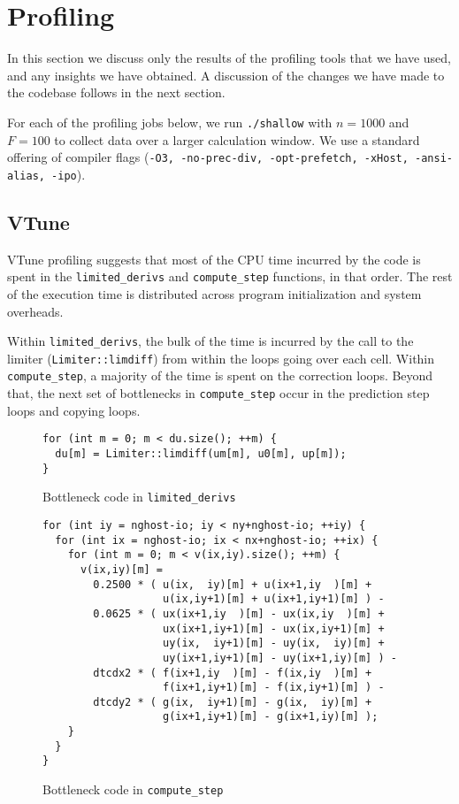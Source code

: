 \documentclass{scrartcl}
\begin{document}
  \section{Profiling}
    In this section we discuss only the results of the profiling tools that we have used, and any insights we have obtained. A discussion of the changes we have made to the codebase follows in the next section.

    For each of the profiling jobs below, we run \verb|./shallow| with $n = 1000$ and $F = 100$ to collect data over a larger calculation window. We use a standard offering of compiler flags (\verb|-O3, -no-prec-div, -opt-prefetch, -xHost, -ansi-alias, -ipo|).
    \subsection{VTune}
    VTune profiling suggests that most of the CPU time incurred by the code is spent in the \verb|limited_derivs| and \verb|compute_step| functions, in that order. The rest of the execution time is distributed across program initialization and system overheads.

    Within \verb|limited_derivs|, the bulk of the time is incurred by the call to the limiter (\verb|Limiter::limdiff|) from within the loops going over each cell. Within \verb|compute_step|, a majority of the time is spent on the correction loops. Beyond that, the next set of bottlenecks in \verb|compute_step| occur in the prediction step loops and copying loops.

    \begin{figure}[ht!]
    \begin{verbatim}for (int m = 0; m < du.size(); ++m) {
  du[m] = Limiter::limdiff(um[m], u0[m], up[m]);
} \end{verbatim}
    \cprotect\caption{Bottleneck code in \verb|limited_derivs|}
    \end{figure}

    \begin{figure}[ht!]
    \begin{verbatim}for (int iy = nghost-io; iy < ny+nghost-io; ++iy) {
  for (int ix = nghost-io; ix < nx+nghost-io; ++ix) {
    for (int m = 0; m < v(ix,iy).size(); ++m) {
      v(ix,iy)[m] =
        0.2500 * ( u(ix,  iy)[m] + u(ix+1,iy  )[m] +
                   u(ix,iy+1)[m] + u(ix+1,iy+1)[m] ) -
        0.0625 * ( ux(ix+1,iy  )[m] - ux(ix,iy  )[m] +
                   ux(ix+1,iy+1)[m] - ux(ix,iy+1)[m] +
                   uy(ix,  iy+1)[m] - uy(ix,  iy)[m] +
                   uy(ix+1,iy+1)[m] - uy(ix+1,iy)[m] ) -
        dtcdx2 * ( f(ix+1,iy  )[m] - f(ix,iy  )[m] +
                   f(ix+1,iy+1)[m] - f(ix,iy+1)[m] ) -
        dtcdy2 * ( g(ix,  iy+1)[m] - g(ix,  iy)[m] +
                   g(ix+1,iy+1)[m] - g(ix+1,iy)[m] );
    }
  }
}\end{verbatim}
    \cprotect\caption{Bottleneck code in \verb|compute_step|}
    \end{figure}
\end{document}
